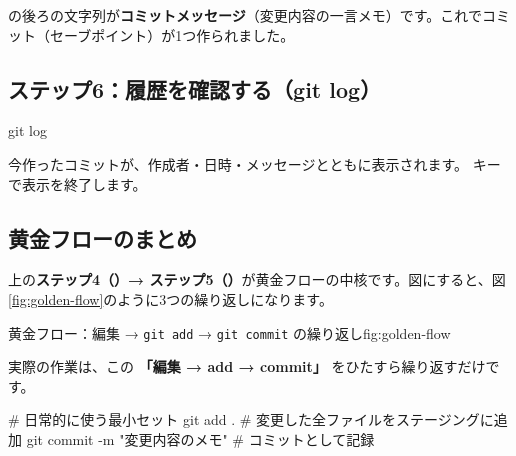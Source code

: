  の後ろの文字列が\textbf{コミットメッセージ}（変更内容の一言メモ）です。これでコミット（セーブポイント）が1つ作られました。

\subsection{ステップ6：履歴を確認する（git log）}

\begin{codebox}[bash]
\begin{code}
git log
\end{code}
\end{codebox}


今作ったコミットが、作成者・日時・メッセージとともに表示されます。 キーで表示を終了します。

\subsection{黄金フローのまとめ}

上の\textbf{ステップ4（）→ ステップ5（）}が黄金フローの中核です。図にすると、図\ref{fig:golden-flow}のように3つの繰り返しになります。

\begin{numfig}{黄金フロー：編集 → \texttt{git add} → \texttt{git commit} の繰り返し}{fig:golden-flow}
\end{numfig}

実際の作業は、この \textbf{「編集 → add → commit」} をひたすら繰り返すだけです。

\begin{codebox}[bash]
\begin{code}
# 日常的に使う最小セット
git add .                       # 変更した全ファイルをステージングに追加
git commit -m "変更内容のメモ"   # コミットとして記録
\end{code}
\end{codebox}

